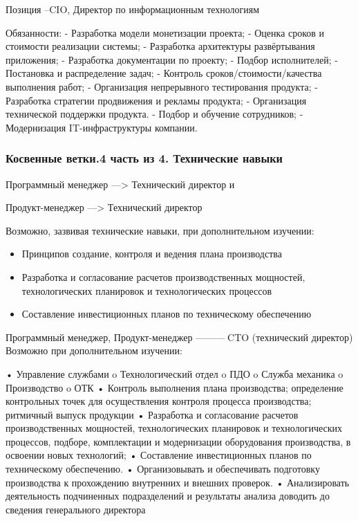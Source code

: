 \documentclass{../industrial-development}
\begin{document}
\lecturenotes
	Позиция –CIO, Директор по информационным технологиям

Обязанности:
- Разработка модели монетизации проекта;
- Оценка сроков и стоимости реализации системы;
- Разработка архитектуры развёртывания приложения;
- Разработка документации по проекту;
- Подбор исполнителей;
- Постановка и распределение задач;
- Контроль сроков/стоимости/качества выполнения работ;
- Организация непрерывного тестирования продукта;
- Разработка стратегии продвижения и рекламы продукта;
- Организация технической поддержки продукта.
- Подбор и обучение сотрудников;
- Модернизация IT-инфраструктуры компании.


\begin{frame} \frametitle{Косвенные ветки.4 часть из 4. Технические навыки}

\begin{block}{Программный менеджер ---> Технический директор  и

Продукт-менеджер ---> Технический директор }

Возможно, зазвивая технические навыки, при дополнительном изучении:
  \end{block}
\begin{itemize}
  \item Принципов создание, контроля и ведения плана производства
  \item Разработка и согласование расчетов производственных мощностей, технологических планировок и технологических процессов
\item Составление инвестиционных планов по техническому обеспечению
  \end{itemize}
\end{frame}

\lecturenotes
Программный менеджер, Продукт-менеджер ---------CTO (технический директор)
Возможно при дополнительном изучении:
 
•	Управление службами
o	Технологический отдел
o	ПДО
o	Служба механика
o	Производство
o	ОТК
•	Контроль выполнения плана производства; определение контрольных точек для осуществления контроля процесса производства; ритмичный выпуск продукции
•	Разработка и согласование расчетов производственных мощностей, технологических планировок и технологических процессов, подборе, комплектации и модернизации оборудования производства, в освоении новых технологий;
•	Составление инвестиционных планов по техническому обеспечению.
•	Организовывать и обеспечивать подготовку производства к прохождению внутренних и внешних проверок.
•	Анализировать деятельность подчиненных подразделений и результаты анализа доводить до сведения генерального директора
\end{document}
